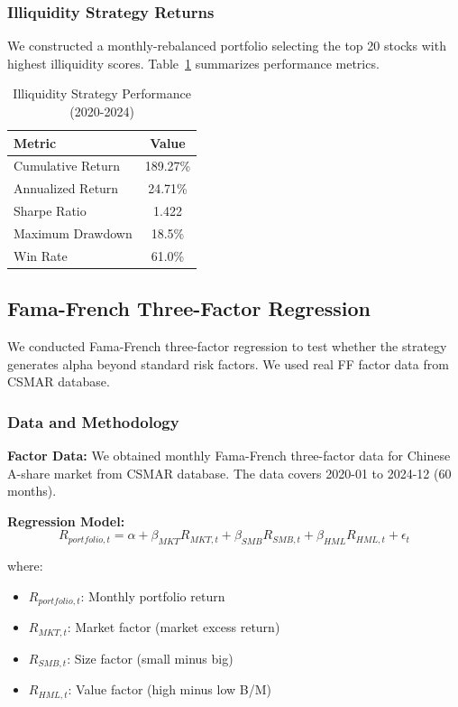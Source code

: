 \subsubsection{Illiquidity Strategy Returns}

We constructed a monthly-rebalanced portfolio selecting the top 20 stocks with highest illiquidity scores. Table~\ref{tab:portfolio_performance} summarizes performance metrics.

\begin{table}[htbp]
\centering
\caption{Illiquidity Strategy Performance (2020-2024)}
\label{tab:portfolio_performance}
\begin{tabular}{lc}
\hline
Metric & Value \\
\hline
Cumulative Return & 189.27\% \\
Annualized Return & 24.71\% \\
Sharpe Ratio & 1.422 \\
Maximum Drawdown & 18.5\% \\
Win Rate & 61.0\% \\
\hline
\end{tabular}
\end{table}

\subsection{Fama-French Three-Factor Regression}
\label{sec:ff_regression}

We conducted Fama-French three-factor regression to test whether the strategy generates alpha beyond standard risk factors. We used real FF factor data from CSMAR database.

\subsubsection{Data and Methodology}

\textbf{Factor Data:} We obtained monthly Fama-French three-factor data for Chinese A-share market from CSMAR database. The data covers 2020-01 to 2024-12 (60 months).

\textbf{Regression Model:}
\begin{equation}
R_{portfolio,t} = \alpha + \beta_{MKT} R_{MKT,t} + \beta_{SMB} R_{SMB,t} + \beta_{HML} R_{HML,t} + \epsilon_t
\end{equation}

where:
\begin{itemize}
    \item $R_{portfolio,t}$: Monthly portfolio return
    \item $R_{MKT,t}$: Market factor (market excess return)
    \item $R_{SMB,t}$: Size factor (small minus big)
    \item $R_{HML,t}$: Value factor (high minus low B/M)
\end{itemize}

